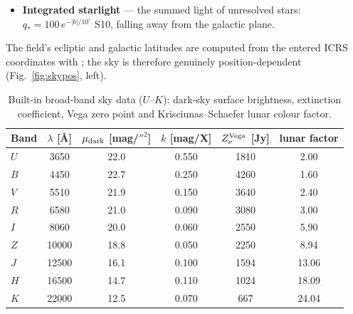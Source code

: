 \begin{itemize}
  column and the scattering efficiency both rise steeply. The solar
  elongation $\epsilon$ (the field's angular distance from the Sun)
  therefore multiplies it by the factor
  \begin{equation}
    g(\epsilon) \;=\;
    \begin{cases}
      (\epsilon/110^\circ)^{-2.3} & 30^\circ \le \epsilon < 110^\circ\\
      1 & \epsilon \ge 110^\circ,
    \end{cases}
  \end{equation}
  a power-law fit to the \citet{leinert1998} tables at $\beta = 0$
  ($\sim$4$\times$ brighter at $\epsilon = 60^\circ$); below $30^\circ$
  the line of sight is unobservable and the factor is held (v10.2).
\item \textbf{Integrated starlight} — the summed light of unresolved
  stars: $q_\ast = 100\,e^{-|b|/10^\circ}$ S10, falling away from the
  galactic plane.
\end{itemize}
The field's ecliptic and galactic latitudes are computed from the entered
ICRS coordinates with ; the sky is therefore genuinely
position-dependent (Fig.~\ref{fig:skypos}, left).

\begin{table}
\centering
\caption{Built-in broad-band sky data ($U$--$K$): dark-sky surface
brightness, extinction coefficient, Vega zero point and
Krisciunas--Schaefer lunar colour factor.}
\label{tab:sky}
\begin{tabular}{lccccc}
\toprule
Band & $\lambda$ [\si{\angstrom}] & $\mu_{\rm dark}$ [mag/$''^2$] &
$k$ [mag/X] & $Z_\nu^{\rm Vega}$ [Jy] & lunar factor \\
\midrule
$U$ &  3650 & 22.0 & 0.550 & 1810 &  2.00 \\
$B$ &  4450 & 22.7 & 0.250 & 4260 &  1.60 \\
$V$ &  5510 & 21.9 & 0.150 & 3640 &  2.40 \\
$R$ &  6580 & 21.0 & 0.090 & 3080 &  3.00 \\
$I$ &  8060 & 20.0 & 0.060 & 2550 &  5.90 \\
$Z$ & 10000 & 18.8 & 0.050 & 2250 &  8.94 \\
$J$ & 12500 & 16.1 & 0.100 & 1594 & 13.06 \\
$H$ & 16500 & 14.7 & 0.110 & 1024 & 18.09 \\
$K$ & 22000 & 12.5 & 0.070 &  667 & 24.04 \\
\bottomrule
\end{tabular}
\end{table}


